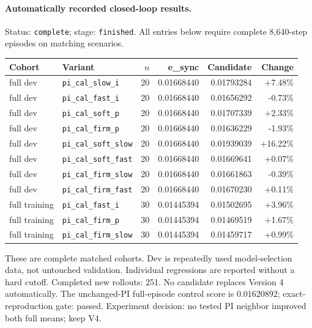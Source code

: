\paragraph{Automatically recorded closed-loop results.}
Status: \texttt{complete}; stage: \texttt{finished}.
All entries below require complete 8,640-step episodes on matching scenarios.
\begin{center}\small
\begin{tabular}{llrrrr}\toprule
Cohort & Variant & $n$ & e\_sync & Candidate & Change \\\midrule
full dev & \texttt{pi\_cal\_slow\_i} & 20 & 0.01668440 & 0.01793284 & +7.48\% \\
full dev & \texttt{pi\_cal\_fast\_i} & 20 & 0.01668440 & 0.01656292 & -0.73\% \\
full dev & \texttt{pi\_cal\_soft\_p} & 20 & 0.01668440 & 0.01707339 & +2.33\% \\
full dev & \texttt{pi\_cal\_firm\_p} & 20 & 0.01668440 & 0.01636229 & -1.93\% \\
full dev & \texttt{pi\_cal\_soft\_slow} & 20 & 0.01668440 & 0.01939039 & +16.22\% \\
full dev & \texttt{pi\_cal\_soft\_fast} & 20 & 0.01668440 & 0.01669641 & +0.07\% \\
full dev & \texttt{pi\_cal\_firm\_slow} & 20 & 0.01668440 & 0.01661863 & -0.39\% \\
full dev & \texttt{pi\_cal\_firm\_fast} & 20 & 0.01668440 & 0.01670230 & +0.11\% \\
full training & \texttt{pi\_cal\_fast\_i} & 30 & 0.01445394 & 0.01502695 & +3.96\% \\
full training & \texttt{pi\_cal\_firm\_p} & 30 & 0.01445394 & 0.01469519 & +1.67\% \\
full training & \texttt{pi\_cal\_firm\_slow} & 30 & 0.01445394 & 0.01459717 & +0.99\% \\
\bottomrule\end{tabular}\end{center}
These are complete matched cohorts. Dev is repeatedly used model-selection data, not untouched validation. Individual regressions are reported without a hard cutoff.
Completed new rollouts: 251. No candidate replaces Version 4 automatically.
The unchanged-PI full-episode control score is $0.01620892$; exact-reproduction gate: passed.
Experiment decision: no tested PI neighbor improved both full means; keep V4.
